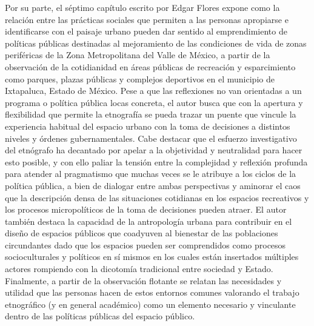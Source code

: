 \documentclass[
  spanish,
  11.5pt,
  170mm x 240mmpaper,
]{scrbook}
\begin{document}
Por su parte, el séptimo capítulo escrito por Edgar Flores expone como
la relación entre las prácticas sociales que permiten a las personas
apropiarse e identificarse con el paisaje urbano pueden dar sentido al
emprendimiento de políticas públicas destinadas al mejoramiento de las
condiciones de vida de zonas periféricas de la Zona Metropolitana del
Valle de México, a partir de la observación de la cotidianidad en áreas
públicas de recreación y esparcimiento como parques, plazas públicas y
complejos deportivos en el municipio de Ixtapaluca, Estado de México.
Pese a que las reflexiones no van orientadas a un programa o política
pública locas concreta, el autor busca que con la apertura y
flexibilidad que permite la etnografía se pueda trazar un puente que
vincule la experiencia habitual del espacio urbano con la toma de
decisiones a distintos niveles y órdenes gubernamentales. Cabe destacar
que el esfuerzo investigativo del etnógrafo ha decantado por apelar a la
objetividad y neutralidad para hacer esto posible, y con ello paliar la
tensión entre la complejidad y reflexión profunda para atender al
pragmatismo que muchas veces se le atribuye a los ciclos de la política
pública, a bien de dialogar entre ambas perspectivas y aminorar el caos
que la descripción densa de las situaciones cotidianas en los espacios
recreativos y los procesos micropolíticos de la toma de decisiones
pueden atraer. El autor también destaca la capacidad de la antropología
urbana para contribuir en el diseño de espacios públicos que coadyuven
al bienestar de las poblaciones circundantes dado que los espacios
pueden ser comprendidos como procesos socioculturales y políticos en sí
mismos en los cuales están insertados múltiples actores rompiendo con la
dicotomía tradicional entre sociedad y Estado. Finalmente, a partir de
la observación flotante se relatan las necesidades y utilidad que las
personas hacen de estos entornos comunes valorando el trabajo
etnográfico (y en general académico) como un elemento necesario y
vinculante dentro de las políticas públicas del espacio público.
\end{document}
